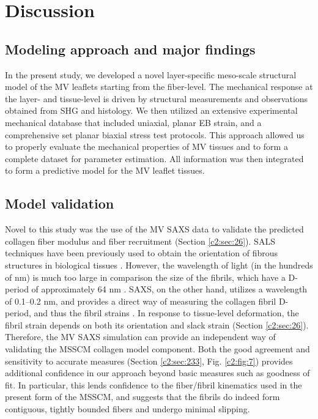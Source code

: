 \section{Discussion}

\subsection{Modeling approach and major findings}

    In the present study, we developed a novel layer-specific meso-scale structural model of the MV leaflets starting from the fiber-level. The mechanical response at the layer- and tissue-level is driven by structural measurements and observations obtained from SHG and histology. We then utilized an extensive experimental mechanical database that included uniaxial, planar EB strain, and a comprehensive set planar biaxial stress test protocols. This approach allowed us to properly evaluate the mechanical properties of MV tissues and to form a complete dataset for parameter estimation. All information was then integrated to form a predictive model for the MV leaflet tissues.
    
    
\subsection{Model validation}

    Novel to this study was the use of the MV SAXS data \cite{liao_relation_2007} to validate the predicted collagen fiber modulus and fiber recruitment (Section \ref{c2:sec:26}). SALS techniques have been previously used to obtain the orientation of fibrous structures in biological tissues \cite{sacks_small_1997}. However, the wavelength of light (in the hundreds of nm) is much too large in comparison the size of the fibrils, which have a D-period of approximately 64 nm \cite{kastelic_structural_1980}\cite{hodge_recent_1963}\cite{chapman_electron_1984}. SAXS, on the other hand, utilizes a wavelength of 0.1–0.2 nm, and provides a direct way of measuring the collagen fibril D-period, and thus the fibril strains \cite{sasaki_elongation_1996}\cite{sasaki_stress_1996}\cite{liao_relation_2007}. In response to tissue-level deformation, the fibril strain depends on both its orientation and slack strain (Section \ref{c2:sec:26}). Therefore, the MV SAXS simulation can provide an independent way of validating the MSSCM collagen model component. Both the good agreement and sensitivity to accurate measures (Section \ref{c2:sec:233}, Fig. \ref{c2:fig:7}) provides additional confidence in our approach beyond basic measures such as goodness of fit. In particular, this lends confidence to the fiber/fibril kinematics used in the present form of the MSSCM, and suggests that the fibrils do indeed form contiguous, tightly bounded fibers and undergo minimal slipping.
    
